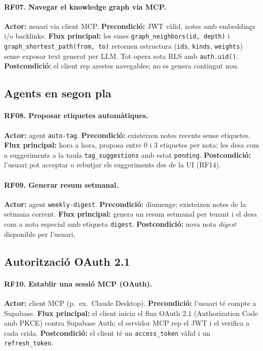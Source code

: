 \paragraph{RF07. Navegar el knowledge graph via MCP.}
\textbf{Actor:} usuari via client MCP.
\textbf{Precondició:} JWT vàlid, notes amb embeddings i/o backlinks.
\textbf{Flux principal:} les eines \texttt{graph\_neighbors(id, depth)}
i \texttt{graph\_shortest\_path(from, to)} retornen estructura
(\texttt{ids}, \texttt{kinds}, \texttt{weights}) sense exposar text
generat per LLM. Tot opera sota RLS amb \texttt{auth.uid()}.
\textbf{Postcondició:} el client rep arestes navegables; no es
genera contingut nou.

\subsection{Agents en segon pla}

\paragraph{RF08. Proposar etiquetes automàtiques.}
\textbf{Actor:} agent \texttt{auto-tag}.
\textbf{Precondició:} existeixen notes recents sense etiquetes.
\textbf{Flux principal:} hora a hora, proposa entre 0 i 3 etiquetes per
nota; les desa com a suggeriments a la taula \texttt{tag\_suggestions}
amb estat \texttt{pending}.
\textbf{Postcondició:} l'usuari pot acceptar o rebutjar els suggeriments
des de la UI (RF14).

\paragraph{RF09. Generar resum setmanal.}
\textbf{Actor:} agent \texttt{weekly-digest}.
\textbf{Precondició:} diumenge; existeixen notes de la setmana
corrent.
\textbf{Flux principal:} genera un resum setmanal per tenant i el desa
com a nota especial amb etiqueta \texttt{digest}.
\textbf{Postcondició:} nova nota \emph{digest} disponible per l'usuari.

\subsection{Autorització OAuth 2.1}

\paragraph{RF10. Establir una sessió MCP (OAuth).}
\textbf{Actor:} client MCP (p.~ex.\ Claude Desktop).
\textbf{Precondició:} l'usuari té compte a Supabase.
\textbf{Flux principal:} el client inicia el flux OAuth 2.1 (Authorization
Code amb PKCE) contra Supabase Auth; el servidor MCP rep el JWT i el
verifica a cada crida.
\textbf{Postcondició:} el client té un \texttt{access\_token} vàlid i un
\texttt{refresh\_token}.

